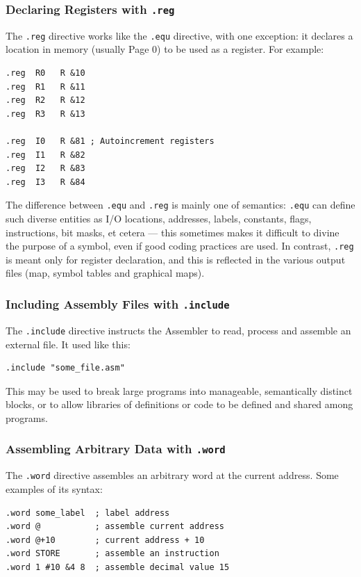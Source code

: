 \documentclass[11pt,a4paper,twocolumns]{article}
\newcommand\f[1]{{\color{black}\texttt{#1}}}
\begin{document}
\subsubsection{Declaring Registers with \f{.reg}}

The \f{.reg} directive works like the \f{.equ} directive, with one exception:
it declares a location in memory (usually Page 0) to be used as a register. For
example:

\begin{verbatim}
.reg  R0   R &10
.reg  R1   R &11
.reg  R2   R &12
.reg  R3   R &13

.reg  I0   R &81 ; Autoincrement registers
.reg  I1   R &82
.reg  I2   R &83
.reg  I3   R &84
\end{verbatim}

The difference between \f{.equ} and \f{.reg} is mainly one of semantics:
\f{.equ} can define such diverse entities as I/O locations, addresses, labels,
constants, flags, instructions, bit masks, et cetera — this sometimes makes it
difficult to divine the purpose of a symbol, even if good coding practices are
used. In contrast, \f{.reg} is meant only for register declaration, and this is
reflected in the various output files (map, symbol tables and graphical maps).

\subsubsection{Including Assembly Files with \f{.include}}

The \f{.include} directive instructs the Assembler to read, process and
assemble an external file. It used like this:

\begin{verbatim}
.include "some_file.asm"
\end{verbatim}

This may be used to break large programs into manageable, semantically distinct
blocks, or to allow libraries of definitions or code to be defined and shared
among programs.



\subsubsection{Assembling Arbitrary Data with \f{.word}}

The \f{.word} directive assembles an arbitrary word at the current
address. Some examples of its syntax:

\begin{verbatim}
.word some_label  ; label address
.word @           ; assemble current address
.word @+10        ; current address + 10
.word STORE       ; assemble an instruction
.word 1 #10 &4 8  ; assemble decimal value 15
\end{verbatim}
\end{document}
